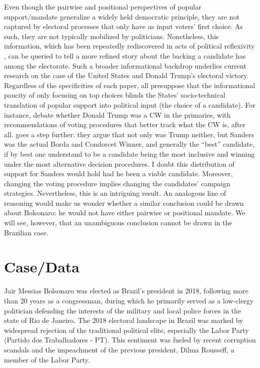 \documentclass[hidelinks,11pt]{article} \usepackage[utf8]{inputenc}
\begin{document}
Even though the pairwise and positional perspectives of popular support/mandate
generalize a widely held democratic principle, they are not captured by
electoral processes that only have as input voters' first choice. As such, they
are not typically mobilized by politicians. Nonetheless, this information, which
has been repeatedly rediscovered in acts of political reflexivity
\parencite{mclean14_stran_histor_social_choic_contr}, can be queried to tell a
more refined story about the backing a candidate has among the electorate. Such
a broader informational backdrop underlies current research on the case of the
United States and Donald Trump's electoral victory. Regardless of the
specificities of each paper, all presuppose that the informational paucity of
only focusing on top choices blinds the States' socio-technical translation of
popular support into political input (the choice of a candidate). For instance,
\textcite{potthoff2021condorcet, woon2020trump, kurrild2018trump} debate whether
Donald Trump was a CW in the primaries, with recommendations of voting
procedures that better track what the CW is, after all.
\textcite{igersheim22_compar_votin_method} goes a step further: they argue that
not only was Trump neither, but Sanders was the actual Borda and Condorcet
Winner, and generally the ``best'' candidate, if by best one understand to be a
candidate being the most inclusive and winning under the most alternative
decision procedures. I doubt this distribution of support for Sanders would hold
had he been a viable candidate. Moreover, changing the voting procedure implies
changing the candidates' campaign strategies. Nevertheless, this is an
intriguing result. An analogous line of reasoning would make us wonder whether a
similar conclusion could be drawn about Bolsonaro: he would not have either
pairwise or positional mandate. We will see, however, that an unambiguous
conclusion cannot be drawn in the Brazilian case.

\section{Case/Data}

Jair Messias Bolsonaro was elected as Brazil's president in 2018, following more
than 20 years as a congressman, during which he primarily served as a
low-clergy politician defending the interests of the military and
local police forces in the state of Rio de Janeiro. The 2018 electoral landscape
in Brazil was marked by widespread rejection of the traditional political elite,
especially the Labor Party (Partido dos Trabalhadores - PT). This sentiment was
fueled by recent corruption scandals and the impeachment of the previous
president, Dilma Rousseff, a member of the Labor Party.
\end{document}
